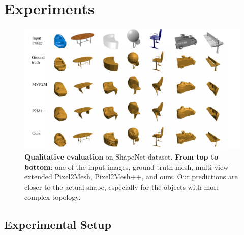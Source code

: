 \section{Experiments}
\begin{figure}[t]
\begin{center}
\includegraphics[width=\linewidth]{imgs/qualitative_evaluation.png}
\end{center}
\caption{
    \textbf{Qualitative evaluation} on ShapeNet dataset. \textbf{From top to bottom}: one of the input images, ground truth mesh, multi-view extended Pixel2Mesh, Pixel2Mesh++, and ours.
    Our predictions are closer to the actual shape, especially for the objects with more complex topology.}

\label{fig:qualitative_evaluation}
\end{figure}

\subsection{Experimental Setup}
\label{subsec:experimental_setup}


